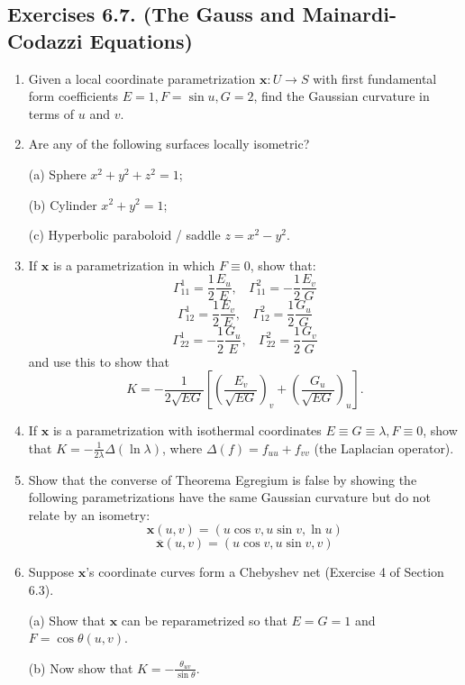 \documentclass[leqno]{book}
\begin{document}
\subsection*{Exercises 6.7. (The Gauss and Mainardi-Codazzi Equations)}
\begin{enumerate}
\item Given a local coordinate parametrization $\mathbf x:U\to S$ with first fundamental form coefficients $E=1,F=\sin u,G=2$, find the Gaussian curvature in terms of $u$ and $v$.

\item Are any of the following surfaces locally isometric? %

(a) Sphere $x^2+y^2+z^2=1$;

(b) Cylinder $x^2+y^2=1$;

(c) Hyperbolic paraboloid / saddle $z=x^2-y^2$.

\item If $\mathbf x$ is a parametrization in which $F\equiv 0$, show that:
$$\Gamma_{11}^1=\frac 12\frac{E_u}E,~~~~\Gamma_{11}^2=-\frac 12\frac{E_v}G$$
$$\Gamma_{12}^1=\frac 12\frac{E_v}E,~~~~\Gamma_{12}^2=\frac 12\frac{G_u}G$$
$$\Gamma_{22}^1=-\frac 12\frac{G_u}E,~~~~\Gamma_{22}^2=\frac 12\frac{G_v}G$$
and use this to show that
$$K=-\frac 1{2\sqrt{EG}}\left[\left(\frac{E_v}{\sqrt{EG}}\right)_v+\left(\frac{G_u}{\sqrt{EG}}\right)_u\right].$$

\item If $\mathbf x$ is a parametrization with isothermal coordinates $E\equiv G\equiv\lambda,F\equiv 0$, show that $K=-\frac 1{2\lambda}\Delta(\ln\lambda)$, where $\Delta(f)=f_{uu}+f_{vv}$ (the Laplacian operator).

\item Show that the converse of Theorema Egregium is false by showing the following parametrizations have the same Gaussian curvature but do not relate by an isometry:
$$\mathbf x(u,v)=(u\cos v,u\sin v,\ln u)$$
$$\overline{\mathbf x}(u,v)=(u\cos v,u\sin v,v)$$

\item Suppose $\mathbf x$'s coordinate curves form a Chebyshev net (Exercise 4 of Section 6.3).

(a) Show that $\mathbf x$ can be reparametrized so that $E=G=1$ and $F=\cos\theta(u,v)$.

(b) Now show that $K=-\frac{\theta_{uv}}{\sin\theta}$.


\end{enumerate}
\end{document}
